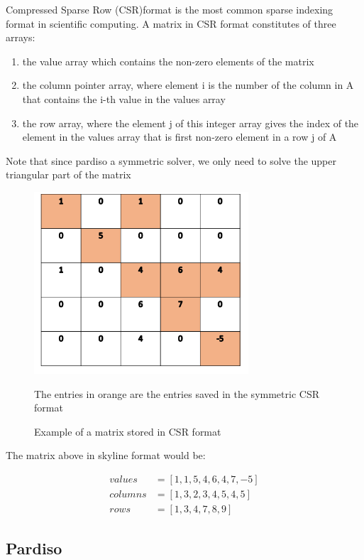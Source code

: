 \documentclass[11pt]{article}
\begin{document}
Compressed Sparse Row (CSR)format is the most common sparse indexing format in scientific computing. A matrix in CSR format constitutes of three arrays:
\begin{enumerate}
\item the value array which contains the non-zero elements of the matrix
\item the column pointer array, where element i is the number of the column in A that contains the i-th value in the values array
\item the row array, where the element j of this integer array gives the index of the element in the values array that is first non-zero element in a row j of A
\end{enumerate}
Note that since pardiso a symmetric solver, we only need to solve the upper triangular part of the matrix
\begin{figure}[H]
\begin{center}

\includegraphics[width=8cm]{csr}
\label{fig:csr}\\
\caption{Example of a matrix stored in CSR format}
The entries in orange are the entries saved in the symmetric CSR format
\end{center}
\end{figure}

The matrix above in skyline format would be:

\begin{align}
values&=[1,1,5,4,6,4,7,-5]\\
columns&= [1,3,2,3,4,5,4,5] \\
rows&= [1,3,4,7,8,9] 
\end{align}

\subsection{Pardiso}
\end{document}
